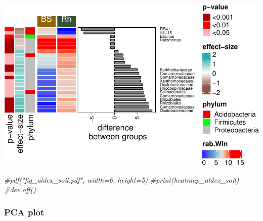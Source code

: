 \documentclass[]{interact}
\theoremstyle{plain}%
\theoremstyle{definition}
\theoremstyle{remark}
\newenvironment{Shaded}{\begin{snugshade}}{\end{snugshade}}
\newcommand{\CommentTok}[1]{\textcolor[rgb]{0.56,0.35,0.01}{\textit{#1}}}
\begin{document}
\begin{center}\includegraphics{Doc_pdf_files/figure-latex/unnamed-chunk-23-1} \end{center}

\begin{Shaded}
\begin{Highlighting}[]
\CommentTok{\#pdf("fig\_aldex\_soil.pdf", width=6, height=5)}
\CommentTok{\#print(heatmap\_aldex\_soil)}
\CommentTok{\#dev.off()}
\end{Highlighting}
\end{Shaded}

\hypertarget{pca-plot}{%
\subsubsection{PCA plot}\label{pca-plot}}
\end{document}
